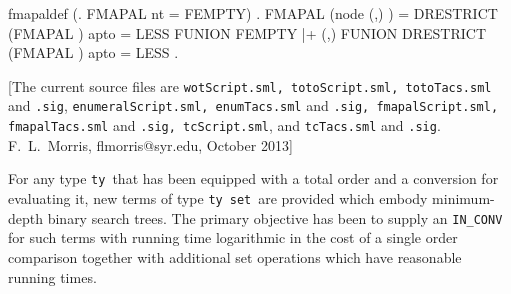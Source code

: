 \begin{SaveVerbatim}{fmapaldef}
\HOLTokenTurnstile{} (\HOLTokenForall{}. FMAPAL  nt = FEMPTY) \HOLTokenConj{}
   \HOLTokenForall{}    .
     FMAPAL  (node  (,) ) =
     DRESTRICT (FMAPAL  ) \HOLTokenLeftbrace{} \HOLTokenBar{} apto    = LESS\HOLTokenRightbrace{} FUNION
     FEMPTY |+ (,) FUNION
     DRESTRICT (FMAPAL  ) \HOLTokenLeftbrace{} \HOLTokenBar{} apto    = LESS\HOLTokenRightbrace{} .
\end{SaveVerbatim}
\newcommand{\bt}{{\tt bt}}
\newcommand{\bl}{{\tt bl}}
\newcommand{\lty}{{\tt ty}}
\newcommand{\typrime}{{\tt ty'}}
\newcommand{\cpn}{{\tt cpn}}
\newcommand{\cmp}{{\tt cmp}}
\newcommand{\toto}{{\tt toto}}
\newcommand{\set}{{\tt set}}
\newcommand{\fmap}{\mbox{\tt fmap}}
\newcommand{\thm}{\mathtt{thm}}
\newcommand{\conv}{\mathtt{conv}}
\newcommand{\ra}{\rightarrow}
%
%
%
%
[The current source files are {\tt wotScript.sml,
totoScript.sml, totoTacs.sml} and {\tt.sig}, {\tt enumeralScript.sml,
enumTacs.sml} and {\tt.sig, fmapalScript.sml, fmapalTacs.sml} and
{\tt.sig, tcScript.sml}, and {\tt tcTacs.sml} and {\tt.sig}.
F.~L.~Morris, flmorris@syr.edu, October 2013]

For any type \lty\ that has been equipped with a total order and a
conversion for evaluating it, new terms of type \lty\ \set\ are provided
which embody minimum-depth binary search trees. The primary
objective has been to supply an \verb$IN_CONV$ for such terms with
running time logarithmic in the cost of a single order comparison together
with additional set operations which have reasonable running times.

